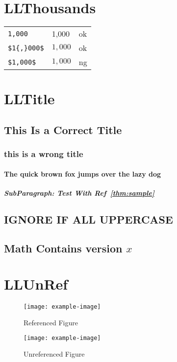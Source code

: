 \documentclass[a4paper]{article}
\newcommand{\tA}[1]{\textcolor{cA}{#1}}
\newcommand{\tD}[1]{\textcolor{cD}{#1}}
\begin{document}
\section{LLThousands}

\begin{table}[H]
	\centering
	\begin{tabular}{lll}
		\verb|1,000|     & 1,000     & \tA{ok} \\
		\verb|$1{,}000$| & $1{,}000$ & \tA{ok} \\
		\verb|$1,000$|   & $1,000$   & \tD{ng} \\
	\end{tabular}
\end{table}

\section{LLTitle}

\subsection{
	This Is a Correct Title
}

\subsubsection{this is a wrong title}

\paragraph{The quick brown fox jumps over the lazy dog}

\subparagraph{SubParagraph: Test With Ref~\ref{thm:sample}}

\subsection{IGNORE IF ALL UPPERCASE}

\subsection{Math Contains version $x$}

\section{LLUnRef}

\begin{figure}[htbp]
  \begin{minipage}{0.5\columnwidth}
    \centering
    \texttt{[image: example-image]}
    \caption{Referenced Figure}
    \label{fig:referenced}
  \end{minipage}%
  \begin{minipage}{0.5\columnwidth}
    \centering
    \texttt{[image: example-image]}
    \caption{Unreferenced Figure}
    \label{fig:unreferenced}
  \end{minipage}
\end{figure}
\end{document}
